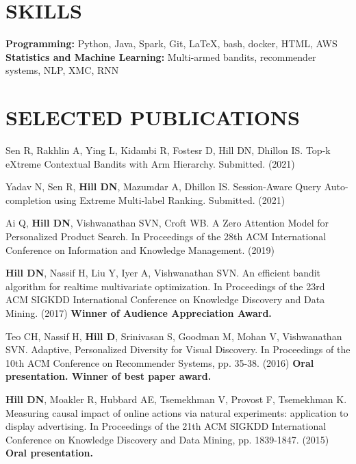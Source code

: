 \documentclass[line,10pt]{res}
\begin{document}
\begin{resume}
\section{SKILLS} 
{\bf Programming:} {\small Python, Java, Spark, Git, \LaTeX, bash, docker, HTML, AWS} \\
{\bf Statistics and Machine Learning: } {\small Multi-armed bandits, recommender systems, NLP, XMC, RNN}
    
\section{SELECTED PUBLICATIONS} 

Sen R, Rakhlin A, Ying L, Kidambi R, Fostesr D, Hill DN, Dhillon IS. Top-k eXtreme Contextual Bandits with Arm Hierarchy. Submitted. (2021)

Yadav N, Sen R, \textbf{Hill DN}, Mazumdar A, Dhillon IS. Session-Aware Query Auto-completion using Extreme Multi-label Ranking. Submitted. (2021)

Ai Q, \textbf{Hill DN}, Vishwanathan SVN, Croft WB. A Zero Attention Model for Personalized Product Search. In Proceedings of the 28th ACM International Conference on Information and Knowledge Management. (2019)

\textbf{Hill DN}, Nassif H, Liu Y, Iyer A, Vishwanathan SVN. An efficient bandit algorithm for realtime multivariate optimization. In Proceedings of the 23rd ACM SIGKDD International Conference on Knowledge Discovery and Data Mining. (2017) \textbf{Winner of Audience Appreciation Award.}

Teo CH, Nassif H, \textbf{Hill D}, Srinivasan S, Goodman M, Mohan V, Vishwanathan SVN. Adaptive, Personalized Diversity for Visual Discovery. In Proceedings of the 10th ACM Conference on Recommender Systems, pp. 35-38. (2016) \textbf{Oral presentation. Winner of best paper award.}

\textbf{Hill DN}, Moakler R, Hubbard AE, Tsemekhman V, Provost F, Tsemekhman K.  Measuring causal impact of online actions via natural experiments: application to display advertising. In Proceedings of the 21th ACM SIGKDD International Conference on Knowledge Discovery and Data Mining, pp. 1839-1847. (2015) \textbf{Oral presentation.}

\end{resume}
\end{document}
